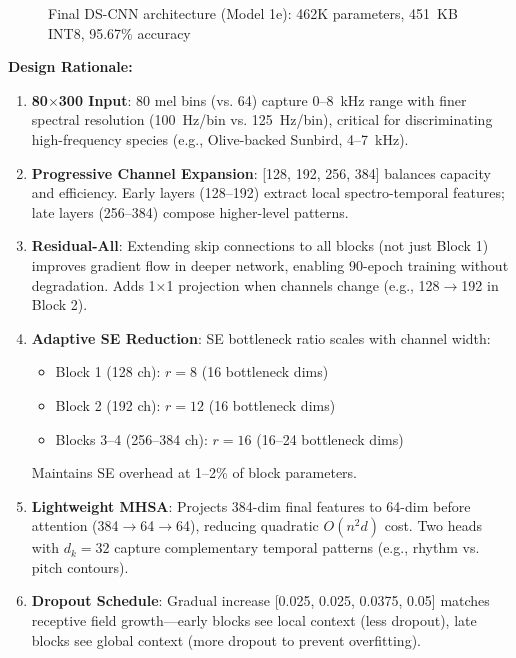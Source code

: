 \documentclass[10pt,a4paper,twoside]{article}
\begin{document}
\begin{figure}[h]
	\caption{Final DS-CNN architecture (Model 1e): 462K parameters, 451~KB INT8, 95.67\% accuracy}
	\label{fig:model1e}
\end{figure}

\noindent\textbf{Design Rationale:}

\begin{enumerate}
	\item \textbf{80$\times$300 Input}: 80 mel bins (vs. 64) capture 0--8~kHz range with finer spectral resolution (100~Hz/bin vs. 125~Hz/bin), critical for discriminating high-frequency species (e.g., Olive-backed Sunbird, 4--7~kHz).

	\item \textbf{Progressive Channel Expansion}: [128, 192, 256, 384] balances capacity and efficiency. Early layers (128--192) extract local spectro-temporal features; late layers (256--384) compose higher-level patterns.

	\item \textbf{Residual-All}: Extending skip connections to all blocks (not just Block 1) improves gradient flow in deeper network, enabling 90-epoch training without degradation. Adds 1×1 projection when channels change (e.g., 128$\to$192 in Block 2).

	\item \textbf{Adaptive SE Reduction}: SE bottleneck ratio scales with channel width:
	\begin{itemize}
		\item Block 1 (128 ch): $r=8$ (16 bottleneck dims)
		\item Block 2 (192 ch): $r=12$ (16 bottleneck dims)
		\item Blocks 3--4 (256--384 ch): $r=16$ (16--24 bottleneck dims)
	\end{itemize}
	Maintains SE overhead at 1--2\% of block parameters.

	\item \textbf{Lightweight MHSA}: Projects 384-dim final features to 64-dim before attention (384$\to$64$\to$64), reducing quadratic $O(n^2d)$ cost. Two heads with $d_k=32$ capture complementary temporal patterns (e.g., rhythm vs. pitch contours).

	\item \textbf{Dropout Schedule}: Gradual increase [0.025, 0.025, 0.0375, 0.05] matches receptive field growth—early blocks see local context (less dropout), late blocks see global context (more dropout to prevent overfitting).
\end{enumerate}
\end{document}
